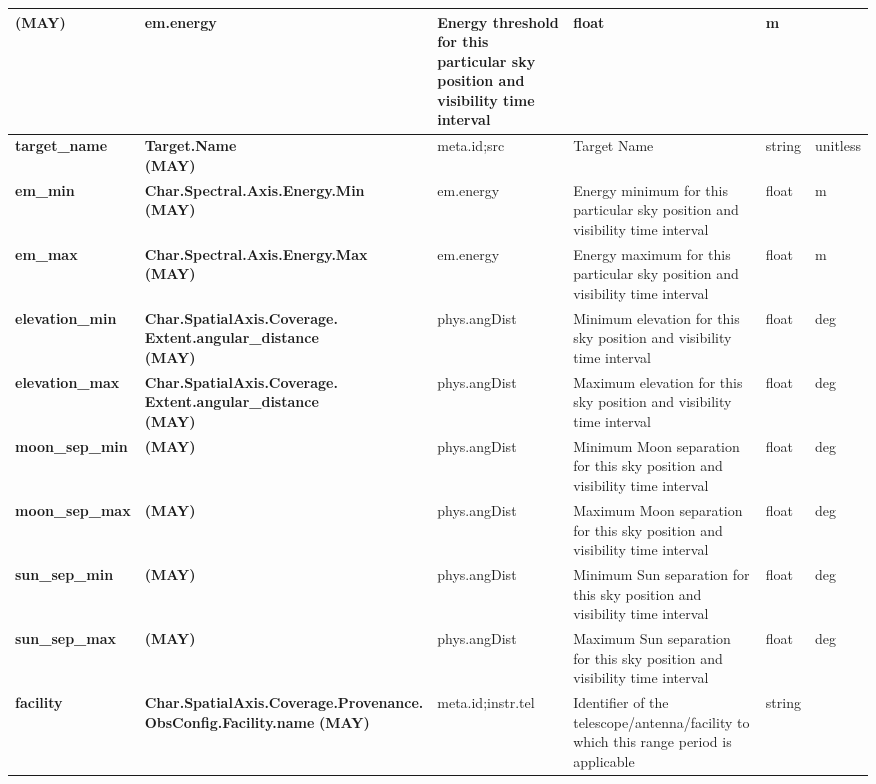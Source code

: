 \documentclass[11pt,a4paper]{ivoatex/ivoa}
\begin{document}
\begin{appendices}
\begin{table}[h]
\begin{adjustbox}{angle=90}
\begin{tabular}{|p{25mm}|p{50mm}|p{20mm}|p{40mm}|p{15mm}|p{10mm}|}
{(MAY)} & em.energy & Energy
threshold for this particular sky position and visibility time interval
& float & m \\
\hline
\pagebreak
\textbf{target\_name} & \textbf{Target.Name  \newline
(MAY)} & meta.id;src &
Target Name & string & unitless \\
\hline
\textbf{em\_min} & \textbf{Char.Spectral.Axis.Energy.Min \newline
(MAY)} &
em.energy & Energy minimum for this particular sky position and
visibility time interval & float & m \\
\hline
\textbf{em\_max} & \textbf{Char.Spectral.Axis.Energy.Max \newline
(MAY)} &
em.energy & Energy maximum for this particular sky position and
visibility time interval & float & m \\
\hline
\textbf{elevation\_min} & \textbf{
Char.SpatialAxis.Coverage. \newline
Extent.angular\_distance \newline
(MAY)} & phys.angDist
& Minimum elevation for this sky position and visibility time interval &
float & deg \\
\hline
\textbf{elevation\_max} & \textbf{
Char.SpatialAxis.Coverage. \newline
Extent.angular\_distance \newline
(MAY)} & phys.angDist
& Maximum elevation for this sky position and visibility time interval &
float & deg \\
\hline
\textbf{moon\_sep\_min} & \textbf{(MAY)} & phys.angDist & Minimum
Moon separation for this sky position and visibility time interval &
float & deg \\
\hline
\textbf{moon\_sep\_max} & \textbf{(MAY)} & phys.angDist & Maximum
Moon separation for this sky position and visibility time interval &
float & deg \\
\hline
\textbf{sun\_sep\_min} & \textbf{(MAY)} & phys.angDist & Minimum Sun
separation for this sky position and visibility time interval & float &
deg \\
\hline
\textbf{sun\_sep\_max} & \textbf{(MAY)} & phys.angDist & Maximum Sun
separation for this sky position and visibility time interval & float &
deg \\
\hline
\textbf{facility} & \textbf{Char.SpatialAxis.Coverage.Provenance.\newline ObsConfig.Facility.name} 
\newline
\textbf{(MAY)} & meta.id;instr.tel & Identifier of the 
telescope/antenna/facility to which this range period is applicable 
& string & \\
\hline
\end{tabular}
\end{adjustbox}
\end{table}
\FloatBarrier
\end{appendices}
\end{document}
